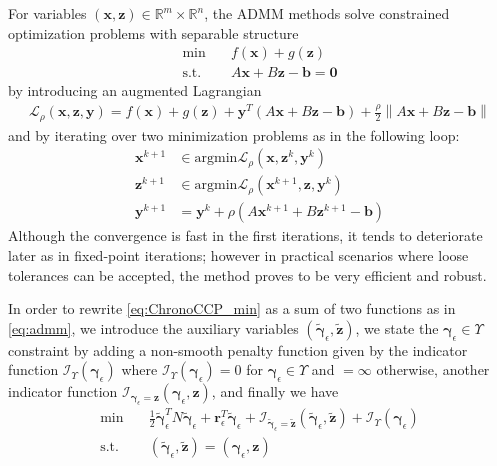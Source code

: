 \documentclass{svproc}
\newcommand{\vect}[1]{\bm{#1}}
\newcommand{\norm}[1]{\left\lVert#1\right\rVert}
\begin{document}
For variables $(\vect{x},\vect{z}) \in \mathbb{R}^m \times \mathbb{R}^n$, the ADMM methods solve constrained optimization problems with separable structure
\begin{subequations}
	\begin{align}
    \text{min} \quad  & f(\vect{x}) + g(\vect{z}) \\
	  \text{s.t.} \quad &  A \vect{x} + B \vect{z} - \vect{b} = \vect{0}
	\end{align}
	\label{eq:admm}
\end{subequations}
by introducing an augmented Lagrangian
\begin{align}
\mathcal{L}_{\rho}(\vect{x},\vect{z},\vect{y})= f(\vect{x}) + g(\vect{z}) + \vect{y}^T (A \vect{x} + B \vect{z} - \vect{b}) + \frac{\rho}{2} \norm{A \vect{x} + B \vect{z} - \vect{b}}
\end{align}
and by iterating over two minimization problems as in the following loop:
\begin{align}
 \vect{x}^{k+1} &\in \text{argmin} \mathcal{L}_{\rho}(\vect{x},\vect{z}^k,\vect{y}^k) \\
 \vect{z}^{k+1} &\in \text{argmin} \mathcal{L}_{\rho}(\vect{x}^{k+1},\vect{z},\vect{y}^k) \\
 \vect{y}^{k+1} &= \vect{y}^{k} + \rho ( A \vect{x}^{k+1} + B \vect{z}^{k+1} - \vect{b} )
 \label{eq:admm_iters}
\end{align}
Although the convergence is fast in the first iterations, it tends to deteriorate later as in fixed-point iterations; however in practical scenarios where loose tolerances can be accepted, the method proves to be very efficient and robust.

In order to rewrite \eqref{eq:ChronoCCP_min} as a sum of two functions as in \eqref{eq:admm}, we introduce the auxiliary variables 
$(\tilde{\vect{\gamma}}_\epsilon,\tilde{\vect{z}})$, 
we state the $\vect{\gamma}_\epsilon \in \Upsilon$ constraint by adding a non-smooth penalty function given by the indicator function 
$\mathcal{I}_\Upsilon (\vect{\gamma}_\epsilon)$ 
where $\mathcal{I}_\Upsilon(\vect{\gamma}_\epsilon)=0$ for $\vect{\gamma}_\epsilon \in \Upsilon$ and $=\infty$ otherwise, another indicator function 
$\mathcal{I}_{\vect{\gamma}_\epsilon = \vect{z}}(\vect{\gamma}_\epsilon,\vect{z})$,
and finally we have
\begin{subequations}
	\begin{align}
    \text{min} \quad & \frac{1}{2} \tilde{\vect{\gamma}}_\epsilon^T N \tilde{\vect{\gamma}}_\epsilon + \vect{r}^T_\epsilon \tilde{\vect{\gamma}}_\epsilon  +  \mathcal{I}_{\tilde{\vect{\gamma}}_\epsilon = \tilde{\vect{z}}}(\tilde{\vect{\gamma}}_\epsilon,\tilde{\vect{z}}) +  \mathcal{I}_\Upsilon(\vect{\gamma}_\epsilon)  \\
	  \text{s.t.} \quad & (\tilde{\vect{\gamma}}_\epsilon,\tilde{\vect{z}})  =  (\vect{\gamma}_\epsilon,\vect{z})
	\end{align}
	\label{eq:admm_mod}
\end{subequations}
\end{document}
